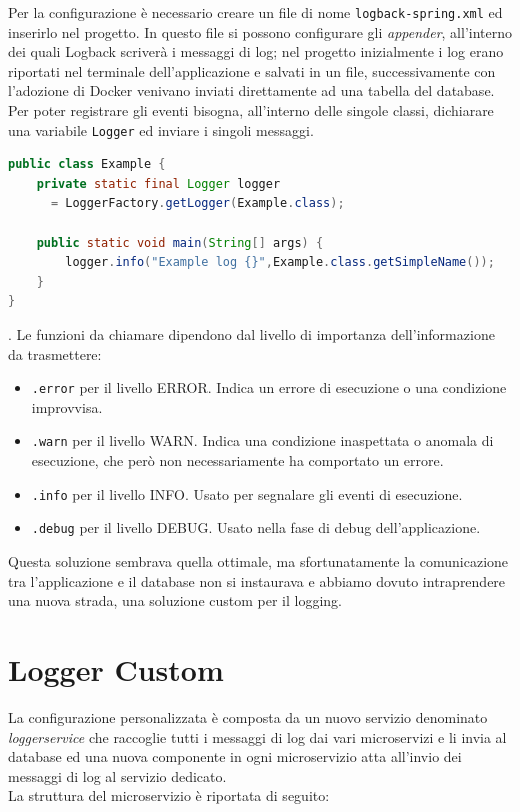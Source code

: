Per la configurazione è necessario creare un file di nome \texttt{logback-spring.xml} ed inserirlo nel progetto. In questo file si possono configurare gli \textit{appender}, all'interno dei quali Logback scriverà i messaggi di log; nel progetto inizialmente i log erano riportati nel terminale dell'applicazione e salvati in un file, successivamente con l'adozione di Docker venivano inviati direttamente ad una tabella del database.\\
Per poter registrare gli eventi bisogna, all'interno delle singole classi, dichiarare una variabile \texttt{Logger} ed inviare i singoli messaggi.
\begin{lstlisting}[language=Java, caption=Esempio Logger Logback, basicstyle=\footnotesize]
public class Example {
    private static final Logger logger 
      = LoggerFactory.getLogger(Example.class);

    public static void main(String[] args) {
        logger.info("Example log {}",Example.class.getSimpleName());
    }
}
\end{lstlisting}
\cite{logbackguide}.
Le funzioni da chiamare dipendono dal livello di importanza dell'informazione da trasmettere:
\begin{itemize}
    \item \texttt{.error} per il livello ERROR. Indica un errore di esecuzione o una condizione improvvisa.
    \item \texttt{.warn} per il livello WARN. Indica una condizione inaspettata o anomala di esecuzione, che però non necessariamente ha comportato un errore.
    \item \texttt{.info} per il livello INFO. Usato per segnalare gli eventi di esecuzione.
    \item \texttt{.debug} per il livello DEBUG. Usato nella fase di debug dell'applicazione.
\end{itemize}
Questa soluzione sembrava quella ottimale, ma sfortunatamente la comunicazione tra l'applicazione e il database non si instaurava e abbiamo dovuto intraprendere una nuova strada, una soluzione custom per il logging.

\section{Logger Custom}

La configurazione personalizzata è composta da  un nuovo servizio denominato \textit{logger\textunderscore service} che raccoglie tutti i messaggi di log dai vari microservizi e li invia al database ed una nuova componente in ogni microservizio atta all'invio dei messaggi di log al servizio dedicato.\\
La struttura del microservizio è riportata di seguito:
\begin{flushleft}
\end{flushleft}

